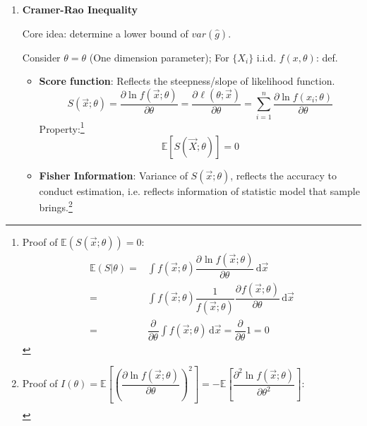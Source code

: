 \begin{enumerate}[topsep=2pt,itemsep=0pt]
\begin{itemize}[topsep=2pt,itemsep=0pt]
        
    \end{itemize}
    



    \item \textbf{Cramer-Rao Inequality}

        Core idea: determine a lower bound of $var(\hat{g})$.

        Consider $\theta=\theta$ (One dimension parameter); For $\{X_i\}$ i.i.d. $f(x,\theta)$: def.
        \begin{itemize}
            \item \textbf{Score function}: Reflects the steepness/slope of likelihood function.
            \begin{equation}\label{EqaScoreFunctionForMLE}
                S(\vec{x};\theta)=\frac{\partial\ln f(\vec{x};\theta)}{\partial\theta}=\dfrac{\partial^{} \ell(\theta;\vec{x})}{\partial \theta^{}}=\sum_{i=1}^n\frac{\partial\ln f(x_i;\theta)}{\partial\theta}
            \end{equation}
            Property:\footnote{Proof of $ \mathbb{E}(S(\vec{x};\theta))=0 $:
            \begin{align}
                \mathbb{E}(S|\theta)=&\int f(\vec{x};\theta ) \dfrac{\partial^{} \ln f(\vec{x};\theta )}{\partial \theta ^{}} \,\mathrm{d}\vec{x}\\
                =&\int f(\vec{x};\theta )\dfrac{1}{f(\vec{x};\theta )}\dfrac{\partial^{}f(\vec{x};\theta ) }{\partial \theta ^{}} \,\mathrm{d}\vec{x}\\
                =&\dfrac{\partial^{} }{\partial \theta ^{}}\int f(\vec{x};\theta ) \,\mathrm{d}\vec{x}=\dfrac{\partial^{} }{\partial \theta ^{}}1=0
            \end{align}
            }
            \begin{equation}\mathbb{E}[S(\vec{X};\theta)]=0\end{equation}
            \item \textbf{Fisher Information}: Variance of $S(\vec{x};\theta)$, reflects the accuracy to conduct estimation, i.e. reflects information of statistic model that sample brings.\footnote{
            Proof of $ I(\theta)=\mathbb{E}\left[\left(\dfrac{\partial \ln f(\vec{x};\theta)}{\partial\theta}\right)^2\right]=-\mathbb{E}\left[\dfrac{\partial^2\ln f(\vec{x};\theta)}{\partial \theta^2}\right] $:
            \begin{align}

\end{align}}
\end{itemize}
\end{enumerate}
